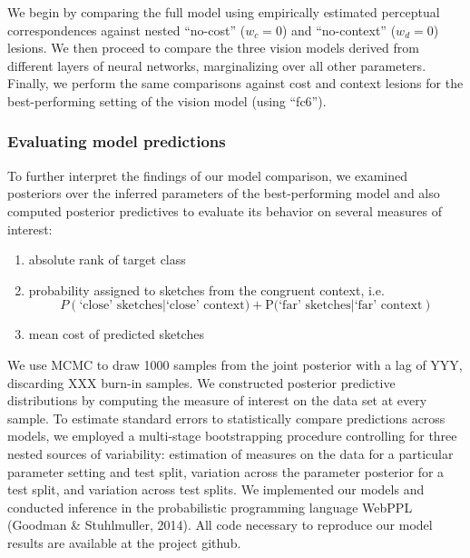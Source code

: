 \documentclass[9pt,twocolumn,twoside]{pnas-new}
\begin{document}
{We begin by comparing the full model using empirically estimated perceptual correspondences against nested ``no-cost'' ($w_c = 0$) and ``no-context'' ($w_d = 0$) lesions. We then proceed to compare the three vision models derived from different layers of neural networks, marginalizing over all other parameters. Finally, we perform the same comparisons against cost and context lesions for the best-performing setting of the vision model (using ``fc6'').

\subsubsection*{Evaluating model predictions}

To further interpret the findings of our model comparison, we examined posteriors over the inferred parameters of the best-performing model and also computed posterior predictives to evaluate its behavior on several measures of interest:
\begin{enumerate}
    \item absolute rank of target class
    \item probability assigned to sketches from the congruent context, i.e. $$P(\textrm{`close' sketches} | \textrm{`close' context)} + \textrm{P(`far' sketches} | \textrm{`far' context})$$
    \item mean cost of predicted sketches
\end{enumerate}
We use MCMC to draw 1000 samples from the joint posterior with a lag of YYY, discarding XXX burn-in samples.
We constructed posterior predictive distributions by computing the measure of interest on the data set at every sample.
To estimate standard errors to statistically compare predictions across models, we employed a multi-stage bootstrapping procedure controlling for three nested sources of variability: estimation of measures on the data for a particular parameter setting and test split, variation across the parameter posterior for a test split, and variation across test splits.
We implemented our models and conducted inference in the probabilistic programming language WebPPL (Goodman \& Stuhlmuller, 2014).
All code necessary to reproduce our model results are available at the project github.

}

\showmatmethods %


\showacknow{} %



\end{document}
